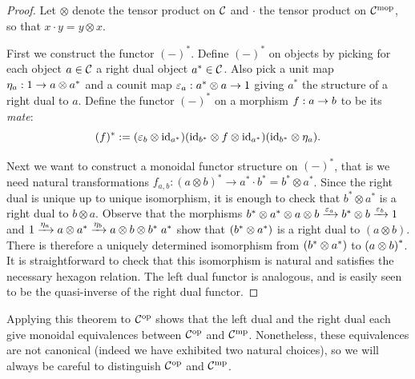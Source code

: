 \documentclass{amsart}
\begin{document}
\begin{proof}
Let $\otimes$ denote the tensor product on $\mathcal C$ and $\cdot$ the tensor product on $\mathcal C^{\mathrm{mop}}$, so that $x \cdot y = y \otimes x$.

First we construct the functor ${(-)^*}$.  Define ${(-)^*}$ on objects by picking for each object $a \in \mathcal C$ a right dual object ${a^*} \in \mathcal C$.  Also pick a unit map $\eta_a: 1 \rightarrow a \otimes {a^*}$ and a counit map  $\varepsilon_a: {a^*} \otimes a \rightarrow 1$  giving ${a^*}$ the structure of a right dual to $a$.  Define the functor ${(-)^*}$ on a morphism $f: a \rightarrow b$ to be its {\em mate}: 
\begin{equation*}
	{(f)^*} := (\varepsilon_b \otimes \mathrm{id}_{{a}^*}) (\mathrm{id}_{{b}^*} \otimes f \otimes \mathrm{id}_{{a}^*}) (\mathrm{id}_{{b}^*} \otimes \eta_a).
\end{equation*}

Next we want to construct a monoidal functor structure on $(-)^*$, that is we need natural transformations $f_{a,b}: (a \otimes b)^* \rightarrow a^* \cdot b^* = b^* \otimes a^*$.  Since the right dual is unique up to unique isomorphism, it is enough to check that $b^* \otimes a^*$ is a right dual to $b \otimes a$.  Observe that the morphisms ${b}^* \otimes {a}^* \otimes a \otimes b \xrightarrow{\varepsilon_a} {b}^* \otimes b \xrightarrow{\varepsilon_b} 1$ and $1 \xrightarrow{\eta_a} a \otimes {a}^* \xrightarrow{\eta_b} a \otimes b \otimes {b}^* \; {a}^*$ show that $({b}^* \otimes {a}^*)$ is a right dual to $(a \otimes b)$.  There is therefore a uniquely determined isomorphism from $({b}^* \otimes {a}^*)$ to ${(a \otimes b)}^*$.  It is straightforward to check that this isomorphism is natural and satisfies the necessary hexagon relation.
The left dual functor is analogous, and is easily seen to be the quasi-inverse of the right dual functor. 
\end{proof}
\begin{remark}
Applying this theorem to $\mathcal C^{\mathrm{op}}$ shows that the left dual and the right dual each give monoidal equivalences between $\mathcal C^{\mathrm{op}}$ and $\mathcal C^{\mathrm{mp}}$.  Nonetheless, these equivalences are not canonical (indeed we have exhibited two natural choices), so we will always be careful to distinguish  $\mathcal C^{\mathrm{op}}$ and $\mathcal C^{\mathrm{mp}}$.
\end{remark}
\end{document}
